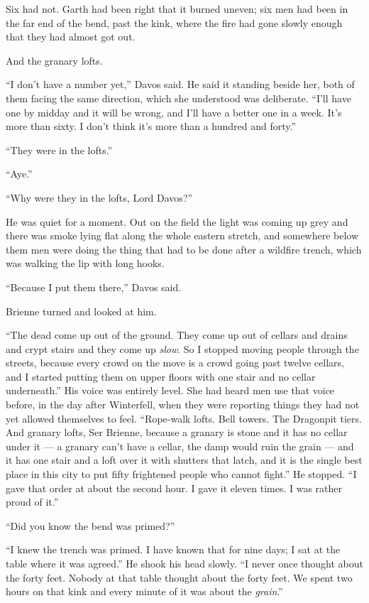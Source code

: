Six had not. Garth had been right that it burned uneven; six men had been in the far end of the bend, past the kink, where the fire had gone slowly enough that they had almost got out.

And the granary lofts.

“I don’t have a number yet,” Davos said. He said it standing beside her, both of them facing the same direction, which she understood was deliberate. “I’ll have one by midday and it will be wrong, and I’ll have a better one in a week. It’s more than sixty. I don’t think it’s more than a hundred and forty.”

“They were in the lofts.”

“Aye.”

“Why were they in the lofts, Lord Davos?”

He was quiet for a moment. Out on the field the light was coming up grey and there was smoke lying flat along the whole eastern stretch, and somewhere below them men were doing the thing that had to be done after a wildfire trench, which was walking the lip with long hooks.

“Because I put them there,” Davos said.

Brienne turned and looked at him.

“The dead come up out of the ground. They come up out of cellars and drains and crypt stairs and they come up \textit{slow}. So I stopped moving people through the streets, because every crowd on the move is a crowd going past twelve cellars, and I started putting them on upper floors with one stair and no cellar underneath.” His voice was entirely level. She had heard men use that voice before, in the day after Winterfell, when they were reporting things they had not yet allowed themselves to feel. “Rope-walk lofts. Bell towers. The Dragonpit tiers. And granary lofts, Ser Brienne, because a granary is stone and it has no cellar under it — a granary can’t have a cellar, the damp would ruin the grain — and it has one stair and a loft over it with shutters that latch, and it is the single best place in this city to put fifty frightened people who cannot fight.” He stopped. “I gave that order at about the second hour. I gave it eleven times. I was rather proud of it.”

“Did you know the bend was primed?”

“I knew the trench was primed. I have known that for nine days; I sat at the table where it was agreed.” He shook his head slowly. “I never once thought about the forty feet. Nobody at that table thought about the forty feet. We spent two hours on that kink and every minute of it was about the \textit{grain}.”

